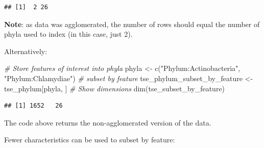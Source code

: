 \documentclass[
]{book}
\newenvironment{Shaded}{\begin{snugshade}}{\end{snugshade}}
\newcommand{\AttributeTok}[1]{\textcolor[rgb]{0.77,0.63,0.00}{#1}}
\newcommand{\CommentTok}[1]{\textcolor[rgb]{0.56,0.35,0.01}{\textit{#1}}}
\newcommand{\FunctionTok}[1]{\textcolor[rgb]{0.00,0.00,0.00}{#1}}
\newcommand{\NormalTok}[1]{#1}
\newcommand{\OtherTok}[1]{\textcolor[rgb]{0.56,0.35,0.01}{#1}}
\newcommand{\SpecialCharTok}[1]{\textcolor[rgb]{0.00,0.00,0.00}{#1}}
\newcommand{\StringTok}[1]{\textcolor[rgb]{0.31,0.60,0.02}{#1}}
\begin{document}
\begin{Shaded}
\end{Shaded}

\begin{verbatim}
## [1]  2 26
\end{verbatim}

\textbf{Note}: as data was agglomerated, the number of rows should equal the
number of phyla used to index (in this case, just 2).

Alternatively:

\begin{Shaded}
\begin{Highlighting}[]
\CommentTok{\# Store features of interest into phyla}
\NormalTok{phyla }\OtherTok{\textless{}{-}} \FunctionTok{c}\NormalTok{(}\StringTok{"Phylum:Actinobacteria"}\NormalTok{, }\StringTok{"Phylum:Chlamydiae"}\NormalTok{)}
\CommentTok{\# subset by feature}
\NormalTok{tse\_phylum\_subset\_by\_feature }\OtherTok{\textless{}{-}}\NormalTok{ tse\_phylum[phyla, ]}
\CommentTok{\# Show dimensions}
\FunctionTok{dim}\NormalTok{(tse\_subset\_by\_feature)}
\end{Highlighting}
\end{Shaded}

\begin{verbatim}
## [1] 1652   26
\end{verbatim}

The code above returns the non-agglomerated version of the data.

Fewer characteristics can be used to subset by feature:
\end{document}
